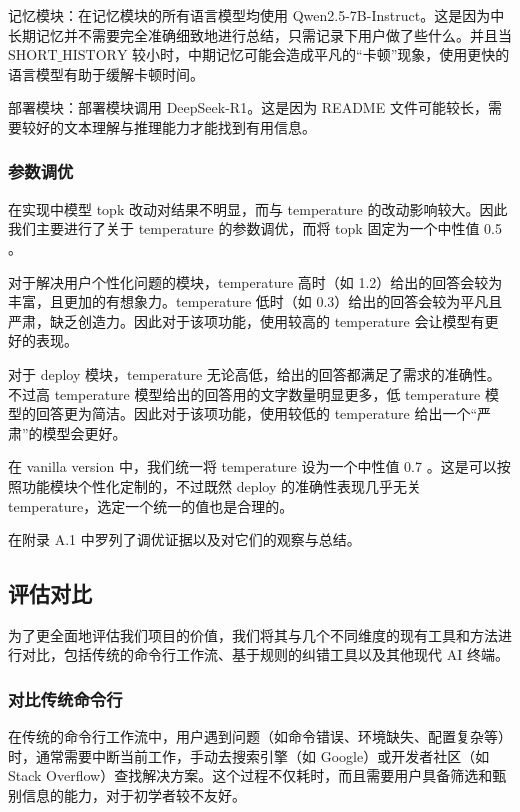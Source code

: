 \documentclass{article}
\theoremstyle{plain}
\theoremstyle{definition}
\theoremstyle{remark}
\begin{document}
记忆模块：在记忆模块的所有语言模型均使用 Qwen2.5-7B-Instruct。这是因为中长期记忆并不需要完全准确细致地进行总结，只需记录下用户做了些什么。并且当 $\text{SHORT\_HISTORY}$ 较小时，中期记忆可能会造成平凡的“卡顿”现象，使用更快的语言模型有助于缓解卡顿时间。

部署模块：部署模块调用 DeepSeek-R1。这是因为 README 文件可能较长，需要较好的文本理解与推理能力才能找到有用信息。

\subsubsection{参数调优}

在实现中模型 topk 改动对结果不明显，而与 temperature 的改动影响较大。因此我们主要进行了关于 temperature 的参数调优，而将 topk 固定为一个中性值 0.5 。

对于解决用户个性化问题的模块，temperature 高时（如 1.2）给出的回答会较为丰富，且更加的有想象力。temperature 低时（如 0.3）给出的回答会较为平凡且严肃，缺乏创造力。因此对于该项功能，使用较高的 temperature 会让模型有更好的表现。

对于 deploy 模块，temperature 无论高低，给出的回答都满足了需求的准确性。不过高 temperature 模型给出的回答用的文字数量明显更多，低 temperature 模型的回答更为简洁。因此对于该项功能，使用较低的 temperature 给出一个“严肃”的模型会更好。

在 vanilla version 中，我们统一将 temperature 设为一个中性值 0.7 。这是可以按照功能模块个性化定制的，不过既然 deploy 的准确性表现几乎无关 temperature，选定一个统一的值也是合理的。

在附录 A.1 中罗列了调优证据以及对它们的观察与总结。

\subsection{评估对比}

为了更全面地评估我们项目的价值，我们将其与几个不同维度的现有工具和方法进行对比，包括传统的命令行工作流、基于规则的纠错工具以及其他现代 AI 终端。

\subsubsection{对比传统命令行}

在传统的命令行工作流中，用户遇到问题（如命令错误、环境缺失、配置复杂等）时，通常需要中断当前工作，手动去搜索引擎（如 Google）或开发者社区（如 Stack Overflow）查找解决方案。这个过程不仅耗时，而且需要用户具备筛选和甄别信息的能力，对于初学者较不友好。
\end{document}
